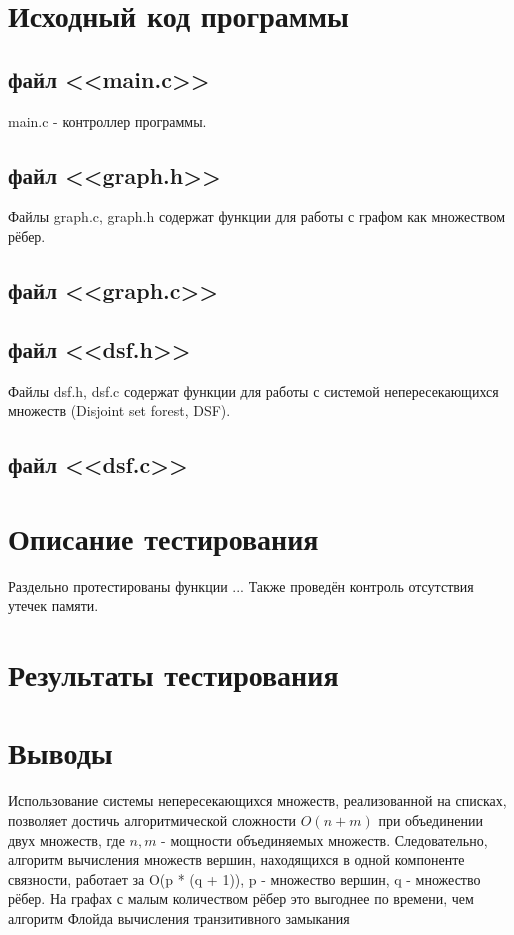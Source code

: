\documentclass[a4paper,12pt]{article} %
\begin{document}

\setcounter{page}{2}
\tableofcontents
\newpage

\newpage
\section{Исходный код программы}
\subsection{файл <<main.c>>}
main.c - контроллер программы.

\subsection{файл <<graph.h>>}
Файлы graph.c, graph.h содержат функции для работы с графом как множеством рёбер.

\subsection{файл <<graph.c>>}

\subsection{файл <<dsf.h>>}
Файлы dsf.h, dsf.c содержат функции для работы с системой непересекающихся множеств (Disjoint set forest, DSF).

\newpage
\subsection{файл <<dsf.c>>}

\section{Описание тестирования}
Раздельно протестированы функции ... Также проведён контроль отсутствия утечек памяти.
\section{Результаты тестирования}
\section{Выводы}
Использование системы непересекающихся множеств, реализованной на списках, позволяет достичь алгоритмической сложности $O(n + m)$ при объединении двух множеств, где $n, m$ - мощности объединяемых множеств. Следовательно, алгоритм вычисления множеств вершин, находящихся в одной компоненте связности, работает за O(p * (q + 1)), p - множество вершин, q - множество рёбер. На графах с малым количеством рёбер это выгоднее по времени, чем алгоритм Флойда вычисления транзитивного замыкания
%
\begin{thebibliography}{100}
\end{thebibliography}
\end{document}
